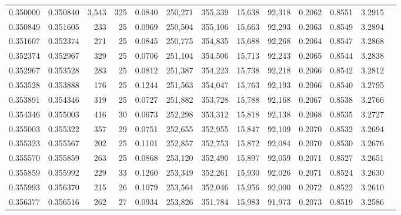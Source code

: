 \begin{tabular}{rrrrrrrrrrrrr}
0.350000 & 0.350840 & 3,543 & 325 &                                     0.0840 & 250,271 & 355,339 &  15,638 &  92,318 & 0.2062 & 0.8551 & 3.2915 \\
0.350849 & 0.351605 &   233 &  25 &                                     0.0969 & 250,504 & 355,106 &  15,663 &  92,293 & 0.2063 & 0.8549 & 3.2894 \\
0.351607 & 0.352374 &   271 &  25 &                                     0.0845 & 250,775 & 354,835 &  15,688 &  92,268 & 0.2064 & 0.8547 & 3.2868 \\
0.352374 & 0.352967 &   329 &  25 &                                     0.0706 & 251,104 & 354,506 &  15,713 &  92,243 & 0.2065 & 0.8544 & 3.2838 \\
0.352967 & 0.353528 &   283 &  25 &                                     0.0812 & 251,387 & 354,223 &  15,738 &  92,218 & 0.2066 & 0.8542 & 3.2812 \\
0.353528 & 0.353888 &   176 &  25 &                                     0.1244 & 251,563 & 354,047 &  15,763 &  92,193 & 0.2066 & 0.8540 & 3.2795 \\
0.353891 & 0.354346 &   319 &  25 &                                     0.0727 & 251,882 & 353,728 &  15,788 &  92,168 & 0.2067 & 0.8538 & 3.2766 \\
0.354346 & 0.355003 &   416 &  30 &                                     0.0673 & 252,298 & 353,312 &  15,818 &  92,138 & 0.2068 & 0.8535 & 3.2727 \\
0.355003 & 0.355322 &   357 &  29 &                                     0.0751 & 252,655 & 352,955 &  15,847 &  92,109 & 0.2070 & 0.8532 & 3.2694 \\
0.355323 & 0.355567 &   202 &  25 &                                     0.1101 & 252,857 & 352,753 &  15,872 &  92,084 & 0.2070 & 0.8530 & 3.2676 \\
0.355570 & 0.355859 &   263 &  25 &                                     0.0868 & 253,120 & 352,490 &  15,897 &  92,059 & 0.2071 & 0.8527 & 3.2651 \\
0.355859 & 0.355992 &   229 &  33 &                                     0.1260 & 253,349 & 352,261 &  15,930 &  92,026 & 0.2071 & 0.8524 & 3.2630 \\
0.355993 & 0.356370 &   215 &  26 &                                     0.1079 & 253,564 & 352,046 &  15,956 &  92,000 & 0.2072 & 0.8522 & 3.2610 \\
0.356377 & 0.356516 &   262 &  27 &                                     0.0934 & 253,826 & 351,784 &  15,983 &  91,973 & 0.2073 & 0.8519 & 3.2586 \\

\end{tabular}
